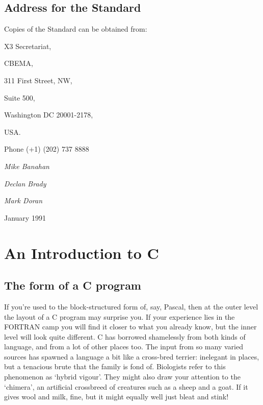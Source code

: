  
        \section*{Address for the Standard}
        

  

  Copies of the Standard can be obtained from:


  

   X3 Secretariat,

   CBEMA,

   311 First Street, NW,

   Suite 500,

   Washington DC 20001-2178,

   USA.

   Phone (+1) (202) 737 8888
  


  
   \begin{center}\textit{Mike Banahan}\end{center}



   \begin{center}\textit{Declan Brady}\end{center}



   \begin{center}\textit{Mark Doran}\end{center}



   

   January 1991
  

 \chapter{An Introduction to C}\label{chap:intro}


        \section{The form of a C program}
        

  

  If you're used to the block-structured form of, say, Pascal, then at the
   outer level the layout of a C program may surprise you. If your experience
   lies in the FORTRAN camp you will find it closer to what you already know,
   but the inner level will look quite different. C has borrowed shamelessly
   from both kinds of language, and from a lot of other places too. The input
   from so many varied sources has spawned a language a bit like a cross-bred
   terrier: inelegant in places, but a tenacious brute that the family is fond
   of.  Biologists refer to this phenomenon as `hybrid vigour'. They
   might also draw your attention to the `chimera', an artificial
   crossbreed of creatures such as a sheep and a goat. If it gives wool and
   milk, fine, but it might equally well just bleat and stink!


